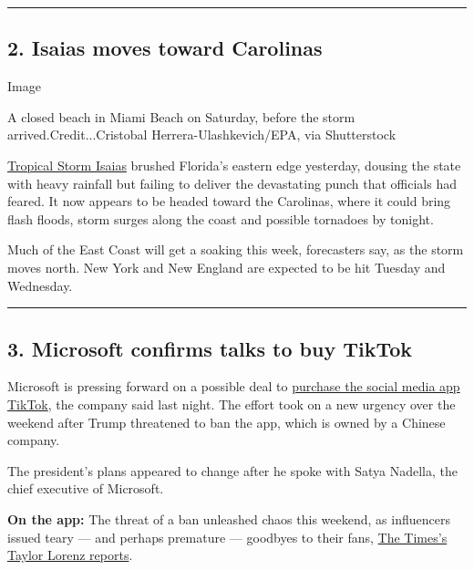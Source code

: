 \begin{center}\rule{0.5\linewidth}{\linethickness}\end{center}

\hypertarget{2-isaias-moves-toward-carolinas}{%
\subsection{2. Isaias moves toward
Carolinas}\label{2-isaias-moves-toward-carolinas}}

Image

A closed beach in Miami Beach on Saturday, before the storm
arrived.Credit...Cristobal Herrera-Ulashkevich/EPA, via Shutterstock

\href{https://www.nytimes3xbfgragh.onion/2020/08/02/us/tropical-storm-isaias-florida-carolina.html}{Tropical
Storm Isaias} brushed Florida's eastern edge yesterday, dousing the
state with heavy rainfall but failing to deliver the devastating punch
that officials had feared. It now appears to be headed toward the
Carolinas, where it could bring flash floods, storm surges along the
coast and possible tornadoes by tonight.

Much of the East Coast will get a soaking this week, forecasters say, as
the storm moves north. New York and New England are expected to be hit
Tuesday and Wednesday.

\begin{center}\rule{0.5\linewidth}{\linethickness}\end{center}

\hypertarget{3-microsoft-confirms-talks-to-buy-tiktok}{%
\subsection{3. Microsoft confirms talks to buy
TikTok}\label{3-microsoft-confirms-talks-to-buy-tiktok}}

Microsoft is pressing forward on a possible deal to
\href{https://www.nytimes3xbfgragh.onion/2020/08/02/business/economy/trump-tiktok-china-national-security.html}{purchase
the social media app TikTok}, the company said last night. The effort
took on a new urgency over the weekend after Trump threatened to ban the
app, which is owned by a Chinese company.

The president's plans appeared to change after he spoke with Satya
Nadella, the chief executive of Microsoft.

\textbf{On the app:} The threat of a ban unleashed chaos this weekend,
as influencers issued teary --- and perhaps premature --- goodbyes to
their fans,
\href{https://www.nytimes3xbfgragh.onion/2020/08/02/style/tiktok-ban-threat-trump.html}{The
Times's Taylor Lorenz reports}.


